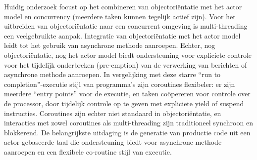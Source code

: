 Huidig onderzoek focust op het combineren van objectoriëntatie met het actor model en concurrency (meerdere taken kunnen tegelijk actief zijn).
Voor het uitbreiden van objectoriëntatie naar een concurrent omgeving is multi-threading een veelgebruikte aanpak.
Integratie van objectoriëntatie met het actor model leidt tot het gebruik van asynchrone methode aanroepen.
Echter, nog objectoriëntatie, nog het actor model biedt ondersteuning voor expliciete controle voor het tijdelijk onderbreken (pre-emption) van de verwerking van berichten of asynchrone methode aanroepen.
In vergelijking met deze starre ``run to completion''-executie stijl van programma's zijn coroutines flexibeler: er zijn meerdere ``entry points'' voor de executie, en taken coöpereren voor controle over de processor, door tijdelijk controle op te geven met expliciete yield of suspend instructies.
Coroutines zijn echter niet standaard in objectoriëntatie,
en interacties met zowel coroutines als multi-threading zijn traditioneel synchroon en blokkerend.
De belangrijkste uitdaging is de generatie van productie code uit een actor gebaseerde taal die ondersteuning biedt voor asynchrone methode aanroepen en een flexibele co-routine stijl van executie.

